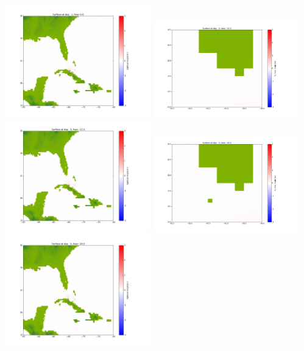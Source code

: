 \documentclass[11pt]{article}
\begin{document}
\includegraphics[width=0.475\textwidth]{frame0012fig1002.png}
\vskip 10pt 
\includegraphics[width=0.475\textwidth]{frame0013fig1001.png}
\includegraphics[width=0.475\textwidth]{frame0013fig1002.png}
\vskip 10pt 
\includegraphics[width=0.475\textwidth]{frame0014fig1001.png}
\includegraphics[width=0.475\textwidth]{frame0014fig1002.png}
\end{document}
